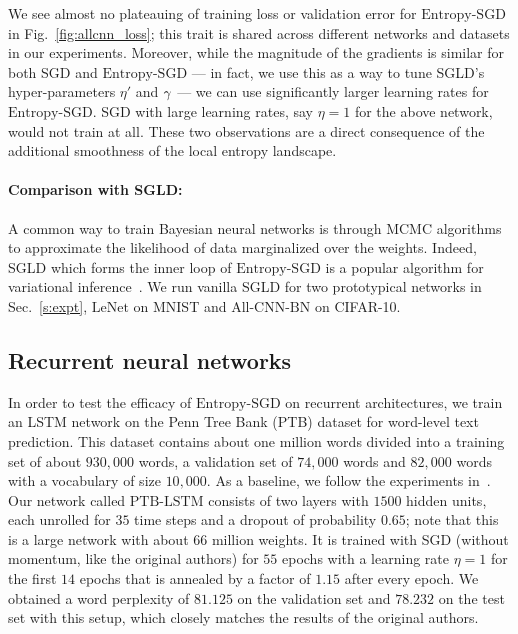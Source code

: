 \documentclass[10pt]{article}
\newcommand{\entropysgd}{\mathrm{Entropy}\textrm{-}\mathrm{SGD}}
\newcommand{\ptblstm}{\textrm{PTB-LSTM}}
\newcommand{\lenet}{\textrm{LeNet}}
\newcommand{\allcnn}{\textrm{All-CNN-BN}}
\newcommand{\pc}[2]{{\color{ForestGreen}#1}\marginpar{\tiny\noindent{\raggedright{\color{Sienna}[PC]}\color{Sienna}{#2} \par}}}
\newcommand{\todo}[1]{{\color{gray}#1}\marginpar{\tiny\noindent{\raggedright{\color{blue}[TODO]}}}}
\begin{document}
We see almost no plateauing of training loss or validation error for $\entropysgd$ in Fig.~\ref{fig:allcnn_loss}; this trait is shared across different networks and datasets in our experiments. Moreover, while the magnitude of the gradients is similar for both SGD and $\entropysgd$ --- in fact, we use this as a way to tune SGLD's hyper-parameters $\eta'$ and $\gamma$ --- we can use significantly larger learning rates for $\entropysgd$. SGD with large learning rates, say $\eta = 1$ for the above network, would not train at all. These two observations are a direct consequence of the additional smoothness of the local entropy landscape.


\paragraph{Comparison with SGLD:}
\todo{A common way to train Bayesian neural networks is through MCMC algorithms to approximate the likelihood of data marginalized over the weights. Indeed, SGLD which forms the inner loop of $\entropysgd$ is a popular algorithm for variational inference~\citep{balan2015bayesian}. We run vanilla SGLD for two prototypical networks in Sec.~\ref{s:expt}, $\lenet$ on MNIST and $\allcnn$ on CIFAR-10.}

\subsection{Recurrent neural networks}
\label{ss:expt:rnn}

In order to test the efficacy of $\entropysgd$ on recurrent architectures, we train an LSTM network on the Penn Tree Bank (PTB) dataset for word-level text prediction. This dataset contains about one million words divided into a training set of about $930,000$ words, a validation set of $74,000$ words and $82,000$ words with a vocabulary of size $10,000$. As a baseline, we follow the experiments in~\citet{zaremba2014recurrent}. Our network called $\ptblstm$ consists of two layers with $1500$ hidden units, each unrolled for $35$ time steps and a dropout of probability $0.65$; note that this is a large network with about $66$ million weights. It is trained with SGD (without momentum, like the original authors) for $55$ epochs with a learning rate $\eta = 1$ for the first $14$ epochs that is annealed by a factor of $1.15$ after every epoch. \pc{We obtained a word perplexity of $81.125$ on the validation set and $78.232$}{std-dev} on the test set with this setup, which closely matches the results of the original authors.
\end{document}
